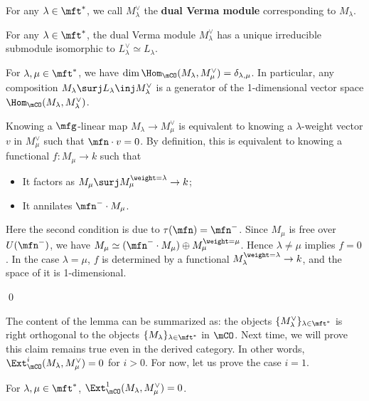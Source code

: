 	

	\begin{defn}
		For any $\lambda\in \mft^*$, we call $M_\lambda^\vee$ the \textbf{dual Verma module} corresponding to $M_\lambda$.
	\end{defn}

	\begin{cor}
		For any $\lambda\in \mft^*$, the dual Verma module $M_\lambda^\vee$ has a unique irreducible submodule isomorphic to $L_\lambda^\vee \simeq L_\lambda$.
	\end{cor}

	\begin{lem}
		For $\lambda,\mu\in \mft^*$, we have $\dim \Hom_\mCO(M_\lambda,M_\mu^\vee) = \delta_{\lambda,\mu}$. In particular, any composition $M_\lambda \surj L_\lambda \inj M_\lambda^\vee$ is a generator of the 1-dimensional vector space $\Hom_\mCO(M_\lambda,M_\lambda^\vee)$.
	\end{lem}

	\proof
		Knowing a $\mfg$-linear map $M_\lambda \to M_\mu^\vee$ is equivalent to knowing a $\lambda$-weight vector $v$ in $M_\mu^\vee$ such that $\mfn\cdot v=0$. By definition, this is equivalent to knowing a functional $f: M_\mu \to k$ such that
		\begin{itemize}
			\item 
				It factors as $M_\mu \surj M_\mu^{\weight = \lambda} \to k$;
			\item
				It annilates $\mfn^-\cdot M_\mu$.
		\end{itemize}
		Here the second condition is due to $\tau(\mfn)=\mfn^-$. Since $M_\mu$ is free over $U(\mfn^-)$, we have $M_\mu \simeq (\mfn^-\cdot M_\mu) \oplus M_\mu^{\weight = \mu}$. Hence $\lambda\neq \mu$ implies $f=0$. In the case $\lambda = \mu$, $f$ is determined by a functional $M_\lambda^{\weight = \lambda} \to k$, and the space of it is 1-dimensional.

	\qed

	\begin{rem}
		The content of the lemma can be summarized as: the objects $\{M_\lambda^\vee\}_{\lambda\in \mft^*}$ is right orthogonal to the objects $\{M_\lambda\}_{\lambda\in \mft^*}$ in $\mCO$. Next time, we will prove this claim remains true even in the derived category. In other words, $\Ext^i_\mCO(M_\lambda,M_\mu^\vee) =0$ for $i>0$. For now, let us prove the case $i=1$.

	\end{rem}

	\begin{lem}
		For $\lambda,\mu\in \mft^*$, $\Ext^1_\mCO(M_\lambda,M_\mu^\vee) =0$.
	\end{lem}

